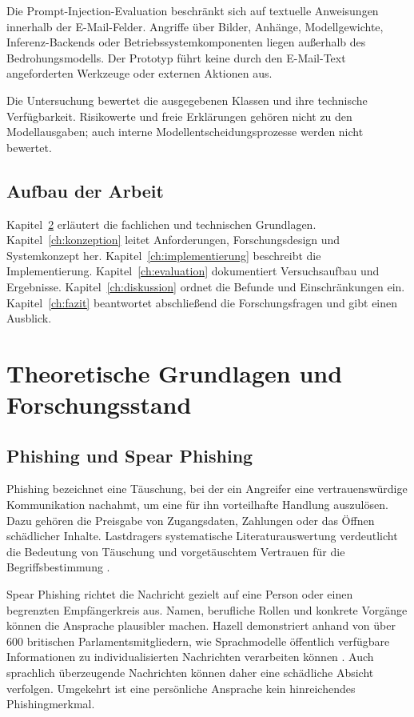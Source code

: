 \documentclass[12pt,twoside=false,a4paper,parskip]{scrbook}
\begin{document}
Die Prompt-Injection-Evaluation beschränkt sich auf textuelle Anweisungen innerhalb der E-Mail-Felder. Angriffe über Bilder, Anhänge, Modellgewichte, Inferenz-Backends oder Betriebssystemkomponenten liegen außerhalb des Bedrohungsmodells. Der Prototyp führt keine durch den E-Mail-Text angeforderten Werkzeuge oder externen Aktionen aus.

Die Untersuchung bewertet die ausgegebenen Klassen und ihre technische Verfügbarkeit. Risikowerte und freie Erklärungen gehören nicht zu den Modellausgaben; auch interne Modellentscheidungsprozesse werden nicht bewertet.

\section{Aufbau der Arbeit}\label{sec:aufbau}

Kapitel~\ref{ch:grundlagen} erläutert die fachlichen und technischen Grundlagen. Kapitel~\ref{ch:konzeption} leitet Anforderungen, Forschungsdesign und Systemkonzept her. Kapitel~\ref{ch:implementierung} beschreibt die Implementierung. Kapitel~\ref{ch:evaluation} dokumentiert Versuchsaufbau und Ergebnisse. Kapitel~\ref{ch:diskussion} ordnet die Befunde und Einschränkungen ein. Kapitel~\ref{ch:fazit} beantwortet abschließend die Forschungsfragen und gibt einen Ausblick.

\chapter{Theoretische Grundlagen und Forschungsstand}\label{ch:grundlagen}

\section{Phishing und Spear Phishing}\label{sec:phishing}

Phishing bezeichnet eine Täuschung, bei der ein Angreifer eine vertrauenswürdige Kommunikation nachahmt, um eine für ihn vorteilhafte Handlung auszulösen. Dazu gehören die Preisgabe von Zugangsdaten, Zahlungen oder das Öffnen schädlicher Inhalte. Lastdragers systematische Literaturauswertung verdeutlicht die Bedeutung von Täuschung und vorgetäuschtem Vertrauen für die Begriffsbestimmung \cite{lastdrager2014consensual}.

Spear Phishing richtet die Nachricht gezielt auf eine Person oder einen begrenzten Empfängerkreis aus. Namen, berufliche Rollen und konkrete Vorgänge können die Ansprache plausibler machen. Hazell demonstriert anhand von über 600 britischen Parlamentsmitgliedern, wie Sprachmodelle öffentlich verfügbare Informationen zu individualisierten Nachrichten verarbeiten können \cite{hazell2023spear}. Auch sprachlich überzeugende Nachrichten können daher eine schädliche Absicht verfolgen. Umgekehrt ist eine persönliche Ansprache kein hinreichendes Phishingmerkmal.
\end{document}
